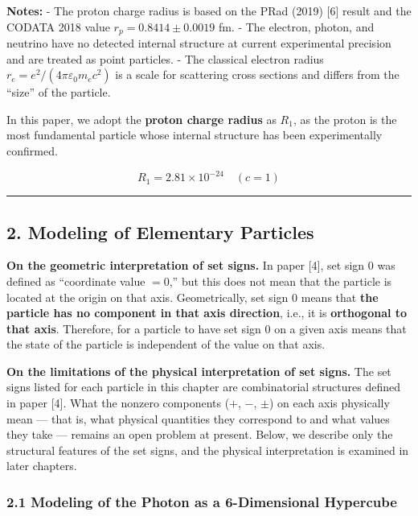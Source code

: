 \documentclass[
  a4paper,11pt]{article}
\theoremstyle{definition}
\theoremstyle{remark}
\begin{document}
\textbf{Notes:} - The proton charge radius is based on the PRad (2019)
{[}6{]} result and the CODATA 2018 value \(r_p = 0.8414 \pm 0.0019\) fm.
- The electron, photon, and neutrino have no detected internal structure
at current experimental precision and are treated as point particles. -
The classical electron radius
\(r_e = e^2 / (4\pi\varepsilon_0 m_e c^2)\) is a scale for scattering
cross sections and differs from the ``size'' of the particle.

In this paper, we adopt the \textbf{proton charge radius} as \(R_1\), as
the proton is the most fundamental particle whose internal structure has
been experimentally confirmed.

\[R_1 = 2.81 \times 10^{-24} \quad (c = 1)\]

\begin{center}\rule{0.5\linewidth}{0.5pt}\end{center}

\subsection{2. Modeling of Elementary
Particles}\label{modeling-of-elementary-particles}

\textbf{On the geometric interpretation of set signs.} In paper {[}4{]},
set sign \(0\) was defined as ``coordinate value \(= 0\),'' but this
does not mean that the particle is located at the origin on that axis.
Geometrically, set sign \(0\) means that \textbf{the particle has no
component in that axis direction}, i.e., it is \textbf{orthogonal to
that axis}. Therefore, for a particle to have set sign \(0\) on a given
axis means that the state of the particle is independent of the value on
that axis.

\textbf{On the limitations of the physical interpretation of set signs.}
The set signs listed for each particle in this chapter are combinatorial
structures defined in paper {[}4{]}. What the nonzero components (\(+\),
\(-\), \(\pm\)) on each axis physically mean --- that is, what physical
quantities they correspond to and what values they take --- remains an
open problem at present. Below, we describe only the structural features
of the set signs, and the physical interpretation is examined in later
chapters.

\subsubsection{2.1 Modeling of the Photon as a 6-Dimensional
Hypercube}\label{modeling-of-the-photon-as-a-6-dimensional-hypercube}
\end{document}
